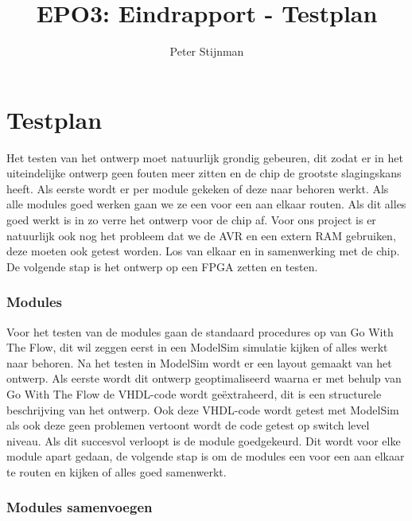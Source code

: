 \documentclass{scrartcl} %
\author{Peter Stijnman}
\title{EPO3: Eindrapport - Testplan}
\begin{document}
\chapter{Testplan}
\label{ch:testplan}


Het testen van het ontwerp moet natuurlijk grondig gebeuren, dit zodat er in het uiteindelijke ontwerp geen fouten meer zitten en de chip de grootste slagingskans heeft. 
Als eerste wordt er per module gekeken of deze naar behoren werkt. Als alle modules goed werken gaan we ze een voor een aan elkaar routen. Als dit alles goed werkt is in zo verre het ontwerp voor de chip af.
Voor ons project is er natuurlijk ook nog het probleem dat we de AVR en een extern RAM gebruiken, deze moeten ook getest worden. Los van elkaar en in samenwerking met de chip.
De volgende stap is  het ontwerp op een FPGA zetten en testen.

\subsection{Modules}

Voor het testen van de modules gaan de standaard procedures op van Go With The Flow, dit wil zeggen eerst in een ModelSim simulatie kijken of alles werkt naar behoren. 
Na het testen in ModelSim wordt er een layout gemaakt van het ontwerp. Als eerste wordt dit ontwerp geoptimaliseerd waarna er met behulp van Go With The Flow de VHDL-code wordt geëxtraheerd,
dit is een structurele beschrijving van het ontwerp. Ook deze VHDL-code wordt getest met ModelSim als ook deze geen problemen vertoont wordt de code getest op switch level niveau. Als dit succesvol verloopt is de module goedgekeurd.
Dit wordt voor elke module apart gedaan, de volgende stap is om de modules een voor een aan elkaar te routen en kijken of alles goed samenwerkt.



\subsection{Modules samenvoegen}
\end{document}
